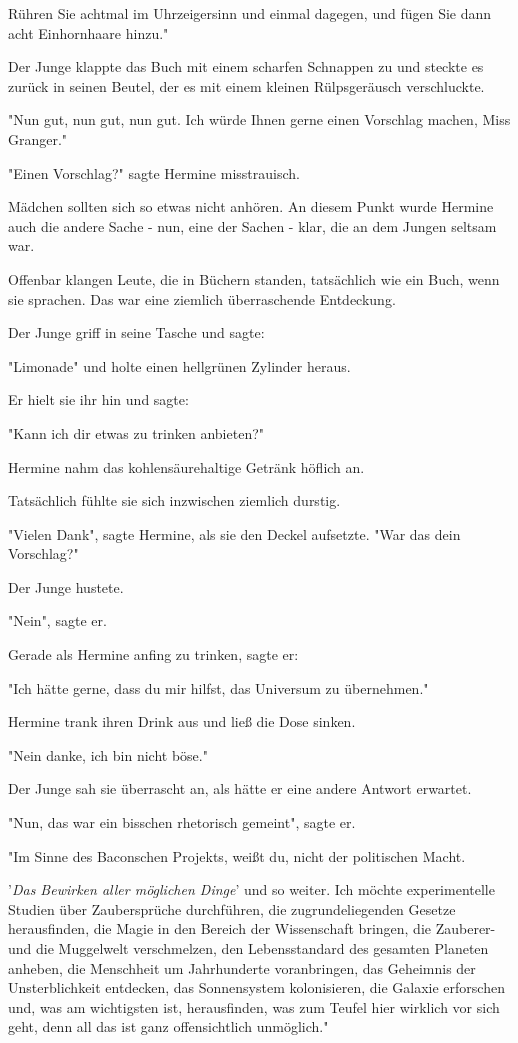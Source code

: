 {Rühren Sie achtmal im Uhrzeigersinn und einmal dagegen, und fügen Sie dann acht Einhornhaare hinzu."

Der Junge klappte das Buch mit einem scharfen Schnappen zu und steckte es zurück in seinen Beutel, der es mit einem kleinen Rülpsgeräusch verschluckte.

"Nun gut, nun gut, nun gut. Ich würde Ihnen gerne einen Vorschlag machen, Miss Granger."

"Einen Vorschlag?" sagte Hermine misstrauisch.

Mädchen sollten sich so etwas nicht anhören. An diesem Punkt wurde Hermine auch die andere Sache - nun, eine der Sachen - klar, die an dem Jungen seltsam war.

Offenbar klangen Leute, die in Büchern standen, tatsächlich wie ein Buch, wenn sie sprachen. Das war eine ziemlich überraschende Entdeckung.

Der Junge griff in seine Tasche und sagte:

"Limonade" und holte einen hellgrünen Zylinder heraus.

Er hielt sie ihr hin und sagte:

"Kann ich dir etwas zu trinken anbieten?"

Hermine nahm das kohlensäurehaltige Getränk höflich an.

Tatsächlich fühlte sie sich inzwischen ziemlich durstig.

"Vielen Dank", sagte Hermine, als sie den Deckel aufsetzte. "War das dein Vorschlag?"

Der Junge hustete.

"Nein", sagte er.

Gerade als Hermine anfing zu trinken, sagte er:

"Ich hätte gerne, dass du mir hilfst, das Universum zu übernehmen."

Hermine trank ihren Drink aus und ließ die Dose sinken.

"Nein danke, ich bin nicht böse."

Der Junge sah sie überrascht an, als hätte er eine andere Antwort erwartet.

"Nun, das war ein bisschen rhetorisch gemeint", sagte er.

"Im Sinne des Baconschen Projekts, weißt du, nicht der politischen Macht.

'\emph{Das Bewirken aller möglichen Dinge}' und so weiter. Ich möchte experimentelle Studien über Zaubersprüche durchführen, die zugrundeliegenden Gesetze herausfinden, die Magie in den Bereich der Wissenschaft bringen, die Zauberer- und die Muggelwelt verschmelzen, den Lebensstandard des gesamten Planeten anheben, die Menschheit um Jahrhunderte voranbringen, das Geheimnis der Unsterblichkeit entdecken, das Sonnensystem kolonisieren, die Galaxie erforschen und, was am wichtigsten ist, herausfinden, was zum Teufel hier wirklich vor sich geht, denn all das ist ganz offensichtlich unmöglich."

}

